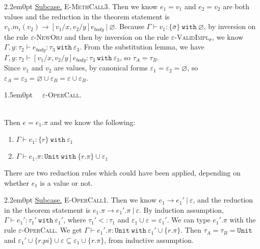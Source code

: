 \documentclass{llncs}
\newcommand{\keywadj}[1]{\mathtt{#1}}
\newcommand{\keyw}[1]{\keywadj{#1}~}
\newcommand{\kw}[1]{\keyw{ #1 }}
\newcommand{\kwa}[1]{\keywadj{ #1 }}
\newcommand{\proofcase}[2]{
	\begin{adjustwidth}{1.5em}{0pt}
		\fbox{Case.}~~#1. \\ ~#2
	\end{adjustwidth}
}
\newcommand{\subcase}[1] {
	\begin{adjustwidth}{2.2em}{0pt}
		\underline{Subcase.} #1
	\end{adjustwidth}
}
\begin{document}
{{{}

\subcase{\textsc{E-MethCall3}. Then we know $e_1 = v_1$ and $e_2 = v_2$ are both values and the reduction in the theorem statement is $v_1.m_i(v_2) \longrightarrow [v_1 / x, v_2 / y]e_{body}~|~\varnothing$. Because $\Gamma \vdash v_1 : \{ \bar \sigma \}~\kw{with} \varnothing$, by inversion on the rule \textsc{$\varepsilon$-NewObj} and then by inversion on the rule \textsc{$\varepsilon$-ValidImpl$_\sigma$}, we know $\Gamma, y: \tau_2 \vdash e_{body} : \tau_3~\kw{with} \varepsilon_3$. From the substitution lemma, we have $\Gamma, y : \tau_2 \vdash [v_1/x, v_2/y]e_{body} : \tau_3~\kw{with} \varepsilon_3$, so $\tau_A = \tau_B$.\\

\noindent
Since $v_1$ and $v_2$ are values, by canonical forms $\varepsilon_1 = \varepsilon_2 = \varnothing$, so $\varepsilon_A = \varepsilon_3 = \varnothing \cup \varepsilon_B = \varepsilon \cup \varepsilon_B$.\\

}

}

\proofcase{\textsc{$\varepsilon$-OperCall}}{

\noindent
Then $e = e_1.\pi$ and we know the following:

\begin{enumerate}
	\item $\Gamma \vdash e_1 : \{ r \}~\kw{with} \varepsilon_1$
	\item $\Gamma \vdash e_1.\pi : \kwa{Unit}~\kw{with} \{ r.\pi \} \cup \varepsilon_1$
\end{enumerate}

\noindent
There are two reduction rules which could have been applied, depending on whether $e_1$ is a value or not.\\

	\subcase{\textsc{E-OperCall1}. Then we know $e_1 \longrightarrow e_1'~|~\varepsilon$, and the reduction in the theorem statement is $e_1.\pi \longrightarrow e_1'.\pi~|~\varepsilon$. By induction assumption, $\Gamma \vdash e_1' : \tau_1'~\kw{with} \varepsilon_1'$, where $\tau_1' <: \tau_1$ and $\varepsilon_1 \cup \varepsilon = \varepsilon_1'$. We can type $e_1'.\pi$ with the rule \textsc{$\varepsilon$-OperCall}. We get $\Gamma \vdash e_1'.\pi : \kwa{Unit}~\kw{with} \varepsilon_1' \cup \{ r.\pi \}$. Then $\tau_A = \tau_B = \kwa{Unit}$ and $\varepsilon_1' \cup \{ r.pi \} \cup \varepsilon \subseteq \varepsilon_1 \cup \{ r.\pi \}$, from inductive assumption.\\
}
	
}}
\end{document}
